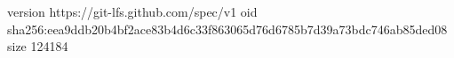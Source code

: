 version https://git-lfs.github.com/spec/v1
oid sha256:eea9ddb20b4bf2ace83b4d6c33f863065d76d6785b7d39a73bdc746ab85ded08
size 124184
